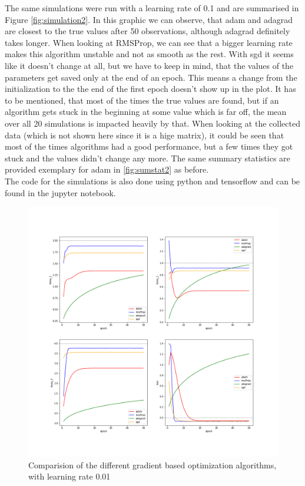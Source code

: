 \documentclass[aodsor,preprint]{imsart}
\numberwithin{equation}{section}
\theoremstyle{plain}
\begin{document}
The same simulations were run with a learning rate of 0.1 and are summarised in Figure \ref{fig:simulation2}. In this graphic we can observe, that adam and adagrad are closest to the true values after 50 observations, although adagrad definitely takes longer. When looking at RMSProp, we can see that a bigger learning rate makes this algorithm unstable and not as smooth as the rest. With sgd it seems like it doesn't change at all, but we have to keep in mind, that the values of the parameters get saved only at the end of an epoch. This means a change from the initialization to the the end of the first epoch doesn't show up in the plot. It has to be mentioned, that most of the times the true values are found, but if an algorithm gets stuck in the beginning at some value which is far off, the mean over all 20 simulations is impacted heavily by that. When looking at the collected data (which is not shown here since it is a hige matrix), it could be seen that most of the times algorithms had a good performance, but a few times they got stuck and the values didn't change any more. The same summary statistics are provided exemplary for adam in \ref{fig:sumstat2} as before.\\
The code for the simulations is also done using python and tensorflow and can be found in the jupyter notebook.

\begin{figure}[htb]
\centering
\includegraphics[scale=	0.37]{images/comparison1.png}
\caption{Comparision of the different gradient based optimization algorithms, with learning rate 0.01}
\label{fig:simulation1}
\end{figure}
\end{document}
